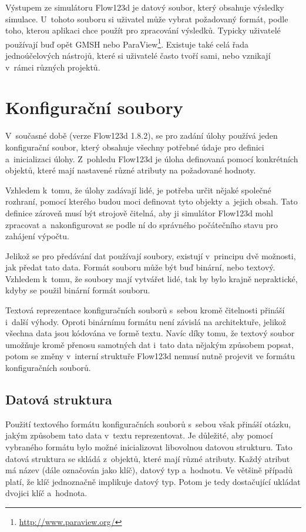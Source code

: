 \documentclass[FM,bw,DP]{tulthesis}
\begin{document}
Výstupem ze simulátoru Flow123d je datový soubor, který obsahuje výsledky simulace. U~tohoto souboru si uživatel může vybrat požadovaný formát, podle toho, kterou aplikaci chce použít pro zpracování výsledků. Typicky uživatelé používají buď opět GMSH nebo ParaView\footnote{\url{http://www.paraview.org/}}. Existuje také celá řada jednoúčelových nástrojů, které si uživatelé často tvoří sami, nebo vznikají v~rámci různých projektů.

\section{Konfigurační soubory}

V~současné době (verze Flow123d 1.8.2), se pro zadání úlohy používá jeden konfigurační soubor, který obsahuje všechny potřebné údaje pro definici a~inicializaci úlohy. Z~pohledu Flow123d je úloha definovaná pomocí konkrétních objektů, které mají nastavené různé atributy na požadované hodnoty. 

Vzhledem k~tomu, že úlohy zadávají lidé, je potřeba určit nějaké společné rozhraní, pomocí kterého budou moci definovat tyto objekty a~jejich obsah. Tato definice zároveň musí být strojově čitelná, aby ji simulátor Flow123d mohl zpracovat a~nakonfigurovat se podle ní do správného počátečního stavu pro zahájení výpočtu.

Jelikož se pro předávání dat používají soubory, existují v~principu dvě možnosti, jak předat tato data. Formát souboru může být buď binární, nebo textový. Vzhledem k~tomu, že soubory mají vytvářet lidé, tak by bylo krajně nepraktické, kdyby se použil binární formát souboru.

Textová reprezentace konfiguračních souborů s~sebou kromě čitelnosti přináší i~další výhody. Oproti binárnímu formátu není závislá na architektuře, jelikož všechna data jsou kódována ve formě textu. Navíc díky tomu, že textový soubor umožňuje kromě přenosu samotných dat i~tato data nějakým způsobem popsat, potom se změny v~interní struktuře Flow123d nemusí nutně projevit ve formátu konfiguračních souborů.

\subsection{Datová struktura}
\label{sec:datova-struktura}
Použití textového formátu konfiguračních souborů s~sebou však přináší otázku, jakým způsobem tato data v~textu reprezentovat. Je důležité, aby pomocí vybraného formátu bylo možné inicializovat libovolnou datovou strukturu. Tato datová struktura se skládá z~objektů, které mají různé atributy. Každý atribut má název (dále označován jako klíč), datový typ a~hodnotu. Ve většině případů platí, že klíč jednoznačně implikuje datový typ. Potom je tedy dostačující ukládat dvojici klíč a~hodnota.
\end{document}
